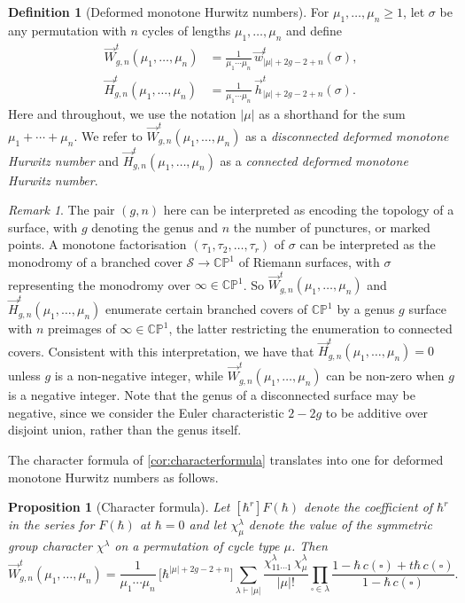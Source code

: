 \documentclass[a4paper]{article}
\theoremstyle{plain}
\newtheorem{proposition}[theorem]{Proposition}
\numberwithin{theorem}{section}
\theoremstyle{definition}
\newtheorem{definition}[theorem]{Definition}
\theoremstyle{remark}
\newtheorem{remark}[theorem]{Remark}
\newcommand{\h}{\hbar}
\renewcommand{\geq}{\geqslant}
\newcommand{\dhn}[2]{\vec{w}^{t}_{#1}(#2)}
\newcommand{\hn}[2]{\vec{h}^{t}_{#1}(#2)}
\newcommand{\dHN}[3]{\vec{W}^t_{#1,#2}(#3)}
\newcommand{\HN}[3]{\vec{H}^t_{#1,#2}(#3)}
\begin{document}
\begin{definition} [Deformed monotone Hurwitz numbers] \label{def:deformed}
For $\mu_1, \ldots, \mu_n \geq 1$, let $\sigma$ be any permutation with $n$ cycles of lengths $\mu_1, \ldots, \mu_n$ and define
\begin{align*}
\dHN{g}{n}{\mu_1, \ldots, \mu_n} &= \frac{1}{\mu_1 \cdots \mu_n} \, \dhn{|\mu|+2g-2+n}{\sigma}, \\
 \HN{g}{n}{\mu_1, \ldots, \mu_n} &= \frac{1}{\mu_1 \cdots \mu_n} \, \hn{|\mu|+2g-2+n}{\sigma}.
\end{align*}
Here and throughout, we use the notation $|\mu|$ as a shorthand for the sum $\mu_1 + \cdots + \mu_n$. We refer to $\dHN{g}{n}{\mu_1, \ldots, \mu_n}$ as a {\em disconnected deformed monotone Hurwitz number} and $ \HN{g}{n}{\mu_1, \ldots, \mu_n}$ as a {\em connected deformed monotone Hurwitz number}.
\end{definition}


\begin{remark}
The pair $(g,n)$ here can be interpreted as encoding the topology of a surface, with $g$ denoting the genus and $n$ the number of punctures, or marked points. A monotone factorisation $(\tau_1, \tau_2, \ldots, \tau_r)$ of $\sigma$ can be interpreted as the monodromy of a branched cover $\mathcal{S} \to \mathbb{CP}^1$ of Riemann surfaces, with $\sigma$ representing the monodromy over $\infty \in \mathbb{CP}^1$. So $\dHN{g}{n}{\mu_1, \ldots, \mu_n}$ and 
$\HN{g}{n}{\mu_1, \ldots, \mu_n}$ enumerate certain branched covers of $\mathbb{CP}^1$ by a genus $g$ surface with $n$ preimages of $\infty \in \mathbb{CP}^1$, the latter restricting the enumeration to connected covers. Consistent with this interpretation, we have that $\HN{g}{n}{\mu_1, \ldots, \mu_n} = 0$ unless $g$ is a non-negative integer, while $\dHN{g}{n}{\mu_1, \ldots, \mu_n}$ can be non-zero when $g$ is a negative integer. Note that the genus of a disconnected surface may be negative, since we consider the Euler characteristic $2 - 2g$ to be additive over disjoint union, rather than the genus itself.
\end{remark}


The character formula of \cref{cor:characterformula} translates into one for deformed monotone Hurwitz numbers as follows.


\begin{proposition} [Character formula] \label{prop:reptheory}
Let $[\h^r] F(\h)$ denote the coefficient of $\h^r$ in the series for $F(\h)$ at $\h = 0$ and let $\chi^\lambda_\mu$ denote the value of the symmetric group character $\chi^\lambda$ on a permutation of cycle type $\mu$. Then
\[
\dHN{g}{n}{\mu_1, \ldots, \mu_n} = \frac{1}{\mu_1 \cdots \mu_n} \, \big[ \h^{|\mu|+2g-2+n} \big] \sum_{\lambda \vdash |\mu|} \frac{\chi^\lambda_{11 \cdots 1} \, \chi^\lambda_\mu}{|\mu|!} \prod_{\square \in \lambda} \frac{1 - \h \, c(\square) + t \h \, c(\square)}{1 - \h \, c(\square)}.
\]
\end{proposition}
\end{document}
